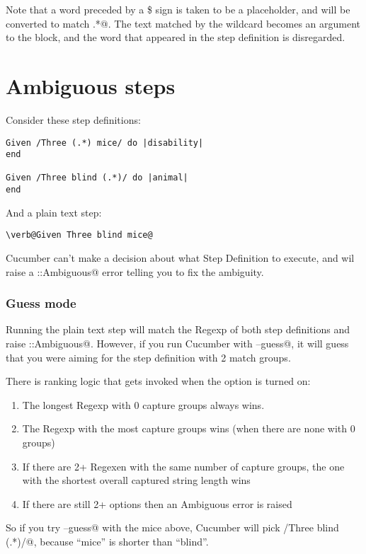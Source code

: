 \documentclass[10pt]{book}
\begin{document}
Note that a word preceded by a \$ sign is taken to be a placeholder, and will be converted to match \verb@.*@. The text matched by the wildcard becomes an argument to the block, and the word that appeared in the step definition is disregarded.

\section{Ambiguous steps}

Consider these step definitions:

\begin{verbatim}
Given /Three (.*) mice/ do |disability|
end

Given /Three blind (.*)/ do |animal|
end

\end{verbatim}
And a plain text step:

\begin{verbatim}
\verb@Given Three blind mice@
\end{verbatim}
Cucumber can't make a decision about what Step Definition to execute, and wil raise a \verb@Cucumber::Ambiguous@ error telling you to fix the ambiguity.

\subsubsection{Guess mode}

Running the plain text step will match the Regexp of both step definitions and raise \verb@Cucumber::Ambiguous@. However,
if you run Cucumber with \verb@--guess@, it will guess that you were aiming for the step definition with 2 match groups.

There is ranking logic that gets invoked when the option is turned on:

\begin{enumerate}
  \item The longest Regexp with 0 capture groups always wins.
  \item The Regexp with the most capture groups wins (when there are none with 0 groups)
  \item If there are 2+ Regexen with the same number of capture groups, the one with the shortest overall captured string length wins
  \item If there are still 2+ options then an Ambiguous error is raised
\end{enumerate}

So if you try \verb@--guess@ with the mice above, Cucumber will pick \verb@/Three blind (.*)/@, because ``mice'' is shorter than ``blind''.
\end{document}

